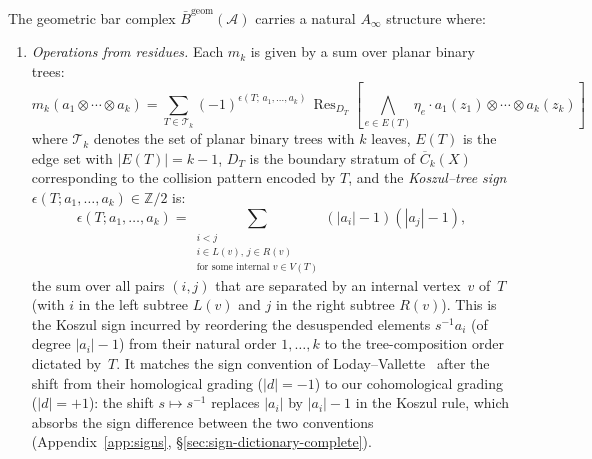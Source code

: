 \begin{theorem}\label{thm:bar-ainfty-complete}
The geometric bar complex $\bar{B}^{\text{geom}}(\mathcal{A})$ carries a natural $A_\infty$ structure where:

\begin{enumerate}
\item \emph{Operations from residues.} Each $m_k$ is given by a sum over planar binary trees:
\begin{equation}\label{eq:mk-tree-sum}
m_k(a_1 \otimes \cdots \otimes a_k) = \sum_{T \in \mathcal{T}_k}
(-1)^{\epsilon(T;\,a_1,\ldots,a_k)}\,
\operatorname{Res}_{D_T}\!\left[\bigwedge_{e \in E(T)} \eta_e
\cdot a_1(z_1) \otimes \cdots \otimes a_k(z_k)\right]
\end{equation}
where $\mathcal{T}_k$ denotes the set of planar binary trees with
$k$ leaves, $E(T)$ is the edge set with $|E(T)| = k-1$, $D_T$ is
the boundary stratum of $\overline{C}_k(X)$ corresponding to the
collision pattern encoded by $T$, and the \emph{Koszul--tree sign}
$\epsilon(T; a_1, \ldots, a_k) \in \mathbb{Z}/2$ is:
\begin{equation}\label{eq:koszul-tree-sign}
\epsilon(T; a_1, \ldots, a_k)
= \sum_{\substack{i < j \\ i \in L(v),\, j \in R(v) \\
  \text{for some internal } v \in V(T)}}
(|a_i| - 1)(|a_j| - 1),
\end{equation}
the sum over all pairs $(i,j)$ that are separated by an internal
vertex~$v$ of~$T$ (with $i$ in the left subtree $L(v)$ and $j$ in
the right subtree $R(v)$).  This is the Koszul sign incurred by
reordering the desuspended elements $s^{-1}a_i$ (of degree
$|a_i| - 1$) from their natural order $1, \ldots, k$ to the
tree-composition order dictated by~$T$.  It matches the sign
convention of Loday--Vallette~\cite[\S10.3.3]{LV12} after the
shift from their homological grading ($|d| = -1$) to our
cohomological grading ($|d| = +1$): the shift $s \mapsto s^{-1}$
replaces $|a_i|$ by $|a_i| - 1$ in the Koszul rule, which absorbs
the sign difference between the two conventions
(Appendix~\ref{app:signs}, \S\ref{sec:sign-dictionary-complete}).


\end{enumerate}
\end{theorem}

